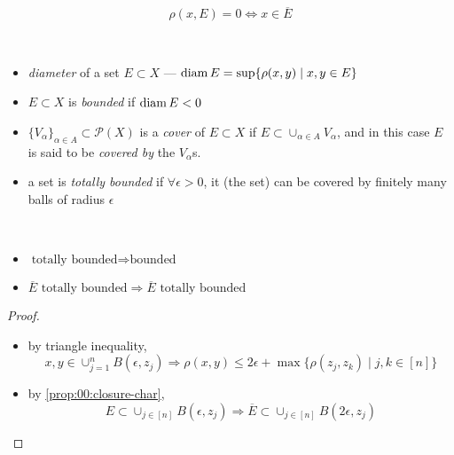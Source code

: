 \begin{rem}{}
  \[ \rho(x, E)=0\iff x\in\overline E \]
\end{rem}

\begin{defn}\
  \begin{itemize}
  \item \emph{diameter} of a set ${E\subset X}$ ---
    ${\operatorname{diam} E = \sup\{\rho(x,y)\mid x,y\in E\}}$
  \item ${E\subset X}$ is \emph{bounded} if ${\operatorname{diam} E < 0}$
  \item ${\{V_\alpha\}_{\alpha\in A} \subset\mathscr{P}(X)}$
    is a \emph{cover} of ${E\subset X}$ if
    ${E\subset \cup_{\alpha\in A} V_\alpha}$,
    and in this case $E$ is said to be \emph{covered by} the
    $V_\alpha$s.
  \item a set is \emph{totally bounded} if $\forall\epsilon>0$,
    it (the set) can be covered by finitely many balls of
    radius $\epsilon$
  \end{itemize}
\end{defn}

\begin{rem}{}\
  \begin{itemize}
  \item ${\text{totally bounded} \Rightarrow \text{bounded}}$
  \item
    ${\overline E \text{ totally bounded} \Rightarrow \overline E \text{ totally bounded}}$
  \end{itemize}
\end{rem}
\begin{proof}\
  \begin{itemize}
  \item by triangle inequality,
    \[
    x,y\in\cup_{j=1}^n B(\epsilon, z_j) \Rightarrow
    \rho(x,y)\leq 2\epsilon +\max\{\rho(z_j, z_k)\mid j,k\in [n]\}
    \]
  \item by \ref{prop:00:closure-char},
    \[
    E\subset\cup_{j\in[n]}B(\epsilon, z_j) \Rightarrow
    \overline E \subset\cup_{j\in[n]} B(2\epsilon, z_j)
    \]
  \end{itemize}
\end{proof}

